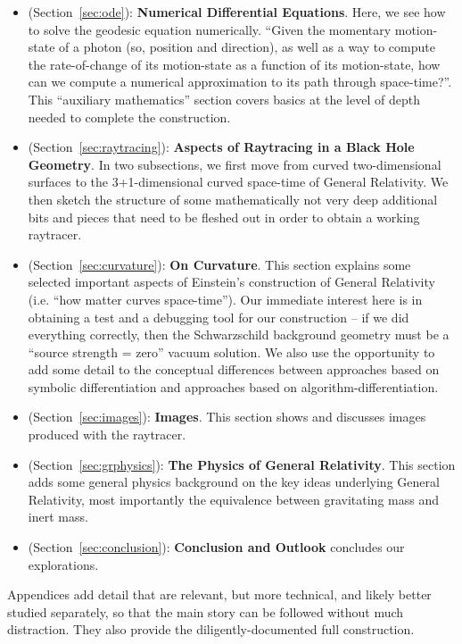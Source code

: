 \documentclass[twocolumn]{article}
\begin{document}
\begin{itemize}
\item (Section~\ref{sec:ode}): {\bf Numerical Differential Equations}.
  Here, we see how to solve the geodesic equation numerically.
  ``Given the momentary motion-state of a photon (so, position and
  direction), as well as a way to compute the rate-of-change of its
  motion-state as a function of its motion-state, how can we compute a
  numerical approximation to its path through space-time?''. This
  ``auxiliary mathematics'' section covers basics at the level of depth
  needed to complete the construction.
  
\item (Section~\ref{sec:raytracing}): {\bf Aspects of Raytracing in a
  Black Hole Geometry}. In two subsections, we first move from
  curved two-dimensional surfaces to the 3+1-dimensional curved
  space-time of General Relativity. We then sketch the structure of
  some mathematically not very deep additional bits and pieces that
  need to be fleshed out in order to obtain a working
  raytracer.

\item (Section~\ref{sec:curvature}): {\bf On Curvature}. This section
  explains some selected important aspects of Einstein's construction
  of General Relativity (i.e. ``how matter curves space-time''). Our
  immediate interest here is in obtaining a test and a debugging tool
  for our construction -- if we did everything correctly, then the
  Schwarzschild background geometry must be a ``source strength =
  zero'' vacuum solution. We also use the opportunity to add some
  detail to the conceptual differences between approaches based on
  symbolic differentiation and approaches based on
  algorithm-differentiation.

\item (Section~\ref{sec:images}): {\bf Images}. This section shows and
  discusses images produced with the raytracer.

\item (Section~\ref{sec:grphysics}): {\bf The Physics of General
  Relativity}. This section adds some general physics background on
  the key ideas underlying General Relativity, most importantly the
  equivalence between gravitating mass and inert mass.
  
\item (Section~\ref{sec:conclusion}): {\bf Conclusion and Outlook} concludes our explorations.
  
\end{itemize}

Appendices add detail that are relevant, but more technical, and
likely better studied separately, so that the main story can be
followed without much distraction. They also provide the
diligently-documented full construction.
\end{document}
